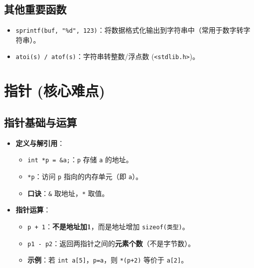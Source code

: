 \documentclass[a4paper,12pt]{article}
\begin{document}
\subsection{其他重要函数}
\begin{itemize}
    \item \texttt{sprintf(buf, "\%d", 123)}：将数据格式化输出到字符串中（常用于数字转字符串）。
    \item \texttt{atoi(s) / atof(s)}：字符串转整数/浮点数 (\texttt{<stdlib.h>})。
\end{itemize}

\section{指针 (核心难点)}

\subsection{指针基础与运算}
\begin{itemize}
    \item \textbf{定义与解引用}：
    \begin{itemize}
        \item \texttt{int *p = \&a;}：\texttt{p} 存储 \texttt{a} 的地址。
        \item \texttt{*p}：访问 \texttt{p} 指向的内存单元（即 \texttt{a}）。
        \item \textbf{口诀}：\texttt{\&} 取地址，\texttt{*} 取值。
    \end{itemize}
    \item \textbf{指针运算}：
    \begin{itemize}
        \item \texttt{p + 1}：\textbf{不是地址加1}，而是地址增加 \texttt{sizeof(类型)}。
        \item \texttt{p1 - p2}：返回两指针之间的\textbf{元素个数}（不是字节数）。
        \item \textbf{示例}：若 \texttt{int a[5]}，\texttt{p=a}，则 \texttt{*(p+2)} 等价于 \texttt{a[2]}。
    \end{itemize}
\end{itemize}
\end{document}
